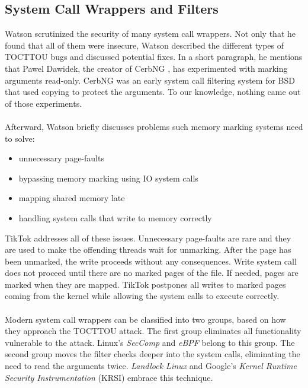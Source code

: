 \subsection{System Call Wrappers and Filters}

Watson \cite{watson2007exploiting} scrutinized the security of many system
call wrappers. Not only that he found that all of them were insecure, Watson
described the different types of TOCTTOU bugs and discussed potential fixes.
In a short paragraph, he mentions that Pawel Dawidek, the creator of CerbNG 
\cite{zak_frasunek_dawidek}, has experimented with marking arguments read-only.
CerbNG was an early system call filtering system for BSD that used copying to 
protect the arguments. To our knowledge, nothing came out of those experiments. 
\\
\\
Afterward, Watson briefly discusses problems such memory marking systems
need to solve: 
\begin{itemize}
    \item unnecessary page-faults
    \item bypassing memory marking using IO system calls
    \item mapping shared memory late
    \item handling system calls that write to memory correctly
\end{itemize}

TikTok addresses all of these issues. Unnecessary page-faults are rare and they
are used to make the offending threads wait for unmarking. After the page has
been unmarked, the write proceeds without any consequences. Write system call
does not proceed until there are no marked pages of the file. If needed, pages
are marked when they are mapped. TikTok postpones all writes to marked pages
coming from the kernel while allowing the system calls to execute correctly.
\\
\\
Modern system call wrappers can be classified into two groups, based on how they
approach the TOCTTOU attack. The first group eliminates all functionality
vulnerable to the attack. Linux's \emph{SecComp}\cite{seccomp} and
\emph{eBPF}\cite{ebpf} belong to this group. The second group moves the filter
checks deeper into the system calls, eliminating the need to read the arguments
twice. \emph{Landlock Linux} \cite{landlock} and Google's \emph{Kernel Runtime
Security Instrumentation} (KRSI)\cite{krsi} embrace this technique.

